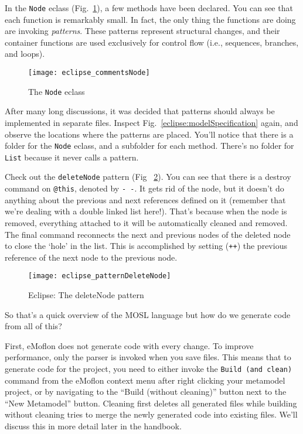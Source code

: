 In the \texttt{Node} eclass (Fig.~\ref{eclipse:eclassNode}), a few methods have been declared. You can see that each function is remarkably small. In fact,
the only thing the functions are doing are invoking \emph{patterns}. These patterns represent structural changes, and their container functions are used
exclusively for control flow (i.e., sequences, branches, and loops).

 \begin{figure}[htbp]
  \centering
  \texttt{[image: eclipse\_commentsNode]}
  \caption{The \texttt{Node} eclass}
  \label{eclipse:eclassNode}
\end{figure}

After many long discussions, it was decided that patterns should always be implemented in separate files. Inspect Fig.~\ref{eclipse:modelSpecification} again,
and observe the locations where the patterns are placed. You'll notice that there is a folder for the \texttt{Node} eclass, and a subfolder for each method. There's
no folder for \texttt{List} because it never calls a pattern.

Check out the \texttt{deleteNode} pattern (Fig ~\ref{eclipse:patternDeleteNode}). You can see that there is a destroy command on \texttt{@this}, denoted by
\texttt{-~-}. It gets rid of the node, but it doesn't do anything about the previous and next references defined on it (remember that we're dealing with a
double linked list here!). That's because when the node is removed, everything attached to it will be automatically cleaned and removed. The final command
reconnects the next and previous nodes of the deleted node to close the `hole' in the list. This is accomplished by setting (\texttt{++}) the previous reference
of the next node to the previous node.

 \begin{figure}[htbp]
  \centering
  \texttt{[image: eclipse\_patternDeleteNode]}
  \caption{Eclipse: The deleteNode pattern}
  \label{eclipse:patternDeleteNode}
\end{figure}
 
So that's a quick overview of the MOSL language but how do we generate code from all of this?

First, eMoflon does not generate code with every change. To improve performance, only the parser is invoked when you save files. This means that to generate
code for the project, you need to either invoke the \texttt{Build (and clean)} command from the eMoflon context menu after right clicking your metamodel
project, or by navigating to the ``Build (without cleaning)'' button next to the ``New Metamodel'' button. Cleaning first deletes all generated files while
building without cleaning tries to merge the newly generated code into existing files. We'll discuss this in more detail later in the handbook.
